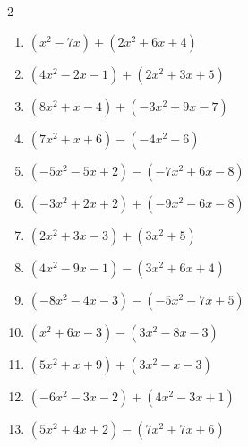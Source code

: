 \begin{multicols}{2}
\begin{enumerate}

  \item $(x^{2}-7x)+(2x^{2}+6x+4)$


  \item $(4x^{2}-2x-1)+(2x^{2}+3x+5)$


  \item $(8x^{2}+x-4)+(-3x^{2}+9x-7)$


  \item $(7x^{2}+x+6)-(-4x^{2}-6)$


  \item $(-5x^{2}-5x+2)-(-7x^{2}+6x-8)$


  \item $(-3x^{2}+2x+2)+(-9x^{2}-6x-8)$


  \item $(2x^{2}+3x-3)+(3x^{2}+5)$


  \item $(4x^{2}-9x-1)-(3x^{2}+6x+4)$


  \item $(-8x^{2}-4x-3)-(-5x^{2}-7x+5)$


  \item $(x^{2}+6x-3)-(3x^{2}-8x-3)$


  \item $(5x^{2}+x+9)+(3x^{2}-x-3)$


  \item $(-6x^{2}-3x-2)+(4x^{2}-3x+1)$


\columnbreak %

\resetques

  \item $(5x^{2}+4x+2)-(7x^{2}+7x+6)$


\end{enumerate}
\end{multicols}
